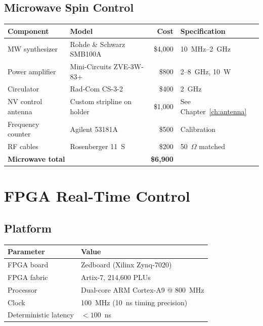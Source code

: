 \documentclass[11pt,a4paper,openany]{book}
\begin{document}
\section{Microwave Spin Control}

\begin{center}
\begin{tabular}{llrl}
\toprule
\textbf{Component} & \textbf{Model} & \textbf{Cost} & \textbf{Specification} \\
\midrule
MW synthesizer & Rohde \& Schwarz SMB100A & \$4,000 & 10~MHz--2~GHz \\
Power amplifier & Mini-Circuits ZVE-3W-83+ & \$800 & 2--8~GHz, 10~W \\
Circulator & Rad-Com CS-3-2 & \$400 & 2~GHz \\
NV control antenna & Custom stripline on holder & \$1,000 & See Chapter~\ref{ch:antenna} \\
Frequency counter & Agilent 53181A & \$500 & Calibration \\
RF cables & Rosenberger 11~S & \$200 & 50~$\Omega$ matched \\
\midrule
\multicolumn{2}{l}{\textbf{Microwave total}} & \textbf{\$6,900} & \\
\bottomrule
\end{tabular}
\end{center}


\chapter{FPGA Real-Time Control}\label{ch:fpga}

\section{Platform}

\begin{center}
\begin{tabular}{ll}
\toprule
\textbf{Parameter} & \textbf{Value} \\
\midrule
FPGA board & Zedboard (Xilinx Zynq-7020) \\
FPGA fabric & Artix-7, 214,600 PLUs \\
Processor & Dual-core ARM Cortex-A9 @ 800~MHz \\
Clock & 100~MHz (10~ns timing precision) \\
Deterministic latency & $< 100$~ns \\
\bottomrule
\end{tabular}
\end{center}
\end{document}
